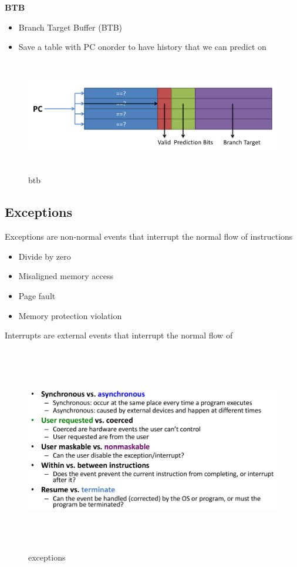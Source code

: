\documentclass{article}
\begin{document}
\newpage

\textbf{BTB}
\begin{itemize}
\item  Branch Target Buffer (BTB)
\item  Save a table with PC onorder to have history that we can predict on
\end{itemize}

\begin{figure}[h]
    \vspace{10mm}
    \centering
    \includegraphics[width=16cm, height=5cm]{image/btb.png} 
    \caption{btb}
\end{figure}


\newpage

\subsection{Exceptions}
Exceptions are non-normal events that interrupt the normal flow of instructions
\begin{itemize}
\item  Divide by zero
\item  Misaligned memory access
\item  Page fault
\item  Memory protection violation
\end{itemize}

Interrupts are external events that interrupt the normal flow of 

\begin{figure}[h]
    \vspace{10mm}
    \centering
    \includegraphics[width=16cm, height=9cm]{image/exceptions.png} 
    \caption{exceptions}
\end{figure}
\end{document}
